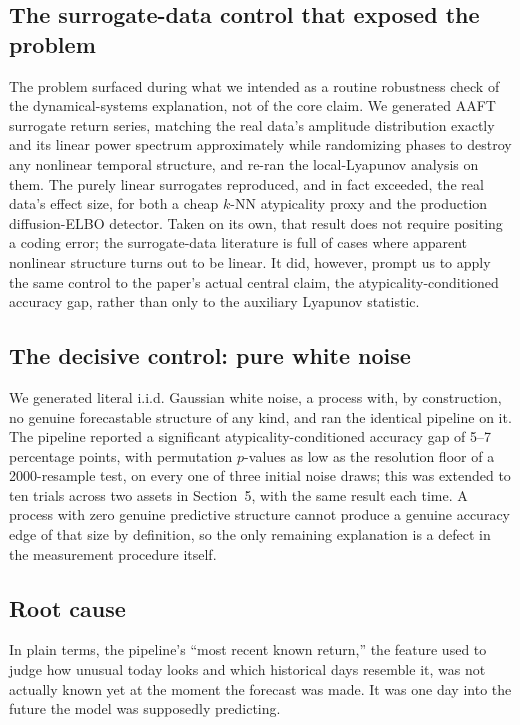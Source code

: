 \documentclass[preprint,12pt]{elsarticle}
\begin{document}
\subsection{The surrogate-data control that exposed the problem}
The problem surfaced during what we intended as a routine robustness check of the
dynamical-systems explanation, not of the core claim. We generated AAFT surrogate return
series, matching the real data's amplitude distribution exactly and its linear power spectrum
approximately while randomizing phases to destroy any nonlinear temporal structure, and re-ran
the local-Lyapunov
analysis on them. The purely linear surrogates reproduced, and in fact exceeded, the real
data's effect size, for both a cheap $k$-NN atypicality proxy and the production diffusion-ELBO
detector. Taken on its own, that result does not require positing a coding error; the
surrogate-data literature is full of cases where apparent nonlinear structure turns out to be
linear. It did, however, prompt us to apply the same control to the paper's actual central
claim, the atypicality-conditioned accuracy gap, rather than only to the auxiliary Lyapunov
statistic.

\subsection{The decisive control: pure white noise}
We generated literal i.i.d. Gaussian white noise, a process with, by construction, no genuine
forecastable structure of any kind, and ran the identical pipeline on it. The pipeline reported
a significant atypicality-conditioned accuracy gap of 5--7 percentage points, with permutation
$p$-values as low as the resolution floor of a 2000-resample test, on every one of three
initial noise draws; this was extended to ten trials across two assets in Section~5, with the
same result each time. A process with zero genuine predictive structure cannot produce a
genuine accuracy edge of that size by definition, so the only remaining explanation is a defect
in the measurement procedure itself.

\subsection{Root cause}
In plain terms, the pipeline's ``most recent known return,'' the feature used to judge how
unusual today looks and which historical days resemble it, was not actually known yet at the
moment the forecast was made. It was one day into the future the model was supposedly
predicting.
\end{document}
